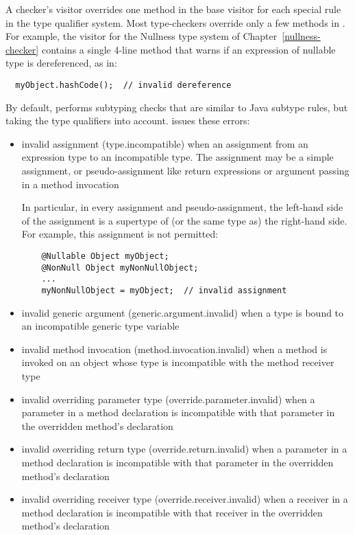 A checker's visitor overrides one method in the base visitor for each special
rule in the type qualifier system.  Most type-checkers
override only a few methods in .  For example, the
visitor for the Nullness type system of Chapter~\ref{nullness-checker}
contains a single 4-line method that warns if an expression of nullable type
is dereferenced, as in:
\begin{Verbatim}
  myObject.hashCode();  // invalid dereference
\end{Verbatim}



By default,  performs subtyping checks that are
similar to Java subtype rules, but taking the type qualifiers into account.
 issues these errors:

\begin{itemize}

\item invalid assignment (type.incompatible) when an assignment from
  an expression type to an incompatible type.  The assignment may be a
  simple assignment, or pseudo-assignment like return expressions or
  argument passing in a method invocation

  In particular, in every assignment and pseudo-assignment, the
  left-hand side of the assignment is a supertype of (or the same type
  as) the right-hand side.  For example, this assignment is not
  permitted:

  \begin{Verbatim}
    @Nullable Object myObject;
    @NonNull Object myNonNullObject;
    ...
    myNonNullObject = myObject;  // invalid assignment
  \end{Verbatim}

\item invalid generic argument (generic.argument.invalid) when a type
  is bound to an incompatible generic type variable

\item invalid method invocation (method.invocation.invalid) when a
  method is invoked on an object whose type is incompatible with the
  method receiver type

\item invalid overriding parameter type (override.parameter.invalid)
  when a parameter in a method declaration is incompatible with that
  parameter in the overridden method's declaration

\item invalid overriding return type (override.return.invalid) when a
  parameter in a method declaration is incompatible with that
  parameter in the overridden method's declaration

\item invalid overriding receiver type (override.receiver.invalid)
  when a receiver in a method declaration is incompatible with that
  receiver in the overridden method's declaration

\end{itemize}


